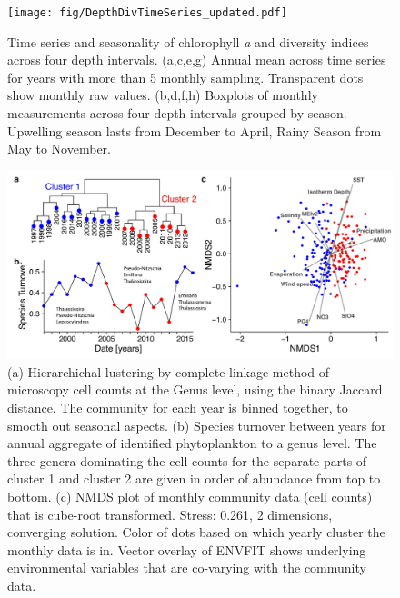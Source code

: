 \documentclass[draft]{agujournal2019}
\begin{document}
\begin{figure}
\begin{center}
\noindent\texttt{[image: fig/DepthDivTimeSeries\_updated.pdf]}
\end{center}
\caption{Time series and seasonality of chlorophyll \textit{a} and diversity indices across four depth intervals. (a,c,e,g) Annual mean across time series for years with more than 5 monthly sampling. Transparent dots show monthly raw values. (b,d,f,h) Boxplots of monthly measurements across four depth intervals grouped by season. Upwelling season lasts from December to April, Rainy Season from May to November.}
\label{fig:divts}
\end{figure}



\begin{figure}
\noindent\includegraphics[width=\textwidth]{fig/Figure4_ClusteringNMDS_v2.pdf}
\caption{(a) Hierarchichal lustering by complete linkage method of microscopy cell counts at the Genus level, using the binary Jaccard distance. The community for each year is binned together, to smooth out seasonal aspects. (b) Species turnover between years for annual aggregate of identified phytoplankton to a genus level. The three genera dominating the cell counts for the separate parts of cluster 1 and cluster 2 are given in order of abundance from top to bottom. (c) NMDS plot of monthly community data (cell counts) that is cube-root transformed. Stress: 0.261, 2 dimensions, converging solution. Color of dots based on which yearly cluster the monthly data is in. Vector overlay of ENVFIT shows underlying environmental variables that are co-varying with the community data.}
\label{fig:clustering}
\end{figure}
\end{document}
